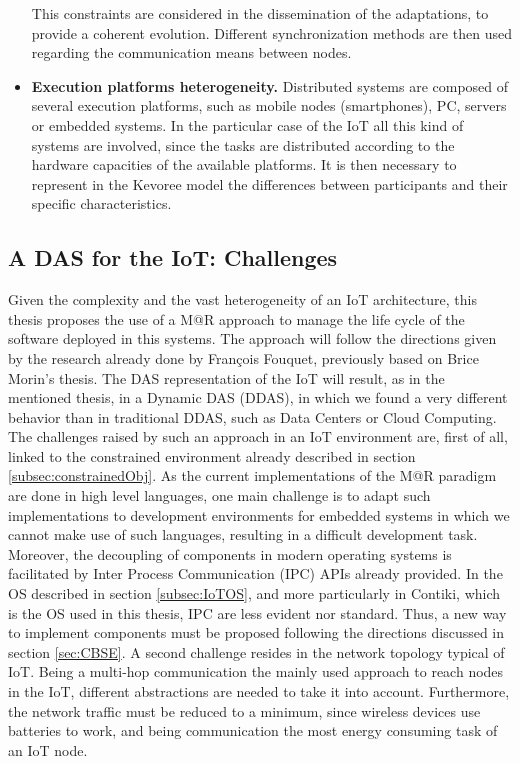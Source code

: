 \begin{itemize}
	This constraints are considered in the dissemination of the adaptations, to provide a coherent evolution.
	Different synchronization methods are then used regarding the communication means between nodes.
	\item \textbf{Execution platforms heterogeneity.} Distributed systems are composed of several execution platforms, such as mobile nodes (smartphones), PC, servers or embedded systems. In the particular case of the IoT all this kind of systems are involved, since the tasks are distributed according to the hardware capacities of the available platforms.
	It is then necessary to represent in the Kevoree model the differences between participants and their specific characteristics.
\end{itemize}


\subsection{A DAS for the IoT: Challenges}
Given the complexity and the vast heterogeneity of an IoT architecture, this thesis proposes the use of a M@R approach to manage the life cycle of the software deployed in this systems.
The approach will follow the directions given by the research already done by Fran{\c{c}}ois Fouquet\cite{fouquet2013kevoree}, previously based on Brice Morin's thesis\cite{morin2010leveraging}.
The DAS representation of the IoT will result, as in the mentioned thesis, in a Dynamic DAS (DDAS), in which we found a very different behavior than in traditional DDAS, such as Data Centers or Cloud Computing.
The challenges raised by such an approach in an IoT environment are, first of all, linked to the constrained environment already described in section \ref{subsec:constrainedObj}.
As the current implementations of the M@R paradigm are done in high level languages, one main challenge is to adapt such implementations to development environments for embedded systems in which we cannot make use of such languages, resulting in a difficult development task.
Moreover, the decoupling of components in modern operating systems is facilitated by Inter Process Communication (IPC) APIs already provided.
In the OS described in section \ref{subsec:IoTOS}, and more particularly in Contiki, which is the OS used in this thesis, IPC are less evident nor standard.
Thus, a new way to implement components must be proposed following the directions discussed in section \ref{sec:CBSE}.
A second challenge resides in the network topology typical of IoT.
Being a multi-hop communication the mainly used approach to reach nodes in the IoT, different abstractions are needed to take it into account.
Furthermore, the network traffic must be reduced to a minimum, since wireless devices use batteries to work, and being communication the most energy consuming task of an IoT node.

